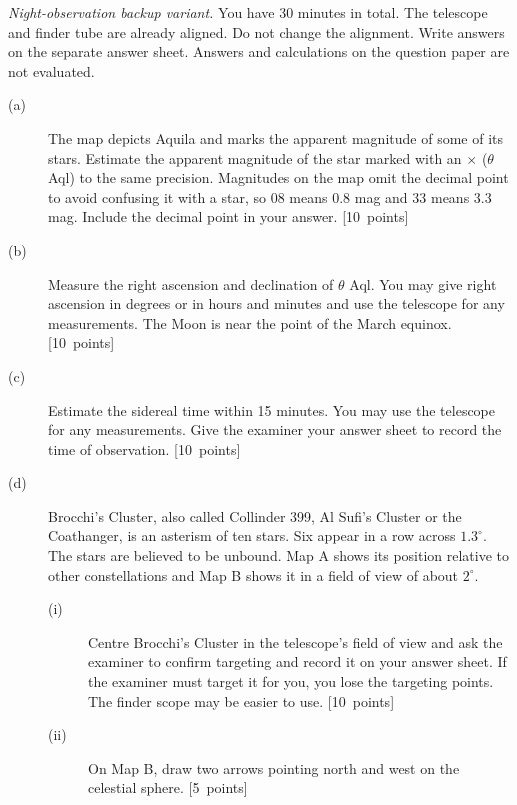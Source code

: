 \textit{Night-observation backup variant.}
You have 30 minutes in total. The telescope and finder tube are already aligned.
Do not change the alignment. Write answers on the separate answer sheet.
Answers and calculations on the question paper are not evaluated.

\begin{description}
\item[(a)] The map depicts Aquila and marks the apparent magnitude of some
of its stars. Estimate the apparent magnitude of the star marked with
an \(\times\) (\(\theta\) Aql) to the same precision. Magnitudes on the map omit
the decimal point to avoid confusing it with a star, so 08 means 0.8 mag and
33 means 3.3 mag. Include the decimal point in your answer.
\hfill\mbox{[10 points]}

\item[(b)] Measure the right ascension and declination of \(\theta\) Aql. You may
give right ascension in degrees or in hours and minutes and use the telescope
for any measurements. The Moon is near the point of the March equinox.
\hfill\mbox{[10 points]}

\item[(c)] Estimate the sidereal time within 15 minutes. You may use the
telescope for any measurements. Give the examiner your answer sheet to
record the time of observation. \hfill\mbox{[10 points]}

\item[(d)] Brocchi's Cluster, also called Collinder 399, Al Sufi's Cluster or
the Coathanger, is an asterism of ten stars. Six appear in a row across
\(1.3^\circ\). The stars are believed to be unbound. Map A shows its position
relative to other constellations and Map B shows it in a field of view of
about \(2^\circ\).
\begin{description}
\item[(i)] Centre Brocchi's Cluster in the telescope's field of view and ask
the examiner to confirm targeting and record it on your answer sheet.
If the examiner must target it for you, you lose the targeting points.
The finder scope may be easier to use. \hfill\mbox{[10 points]}
\item[(ii)] On Map B, draw two arrows pointing north and west on the celestial
sphere. \hfill\mbox{[5 points]}
\end{description}
\end{description}
